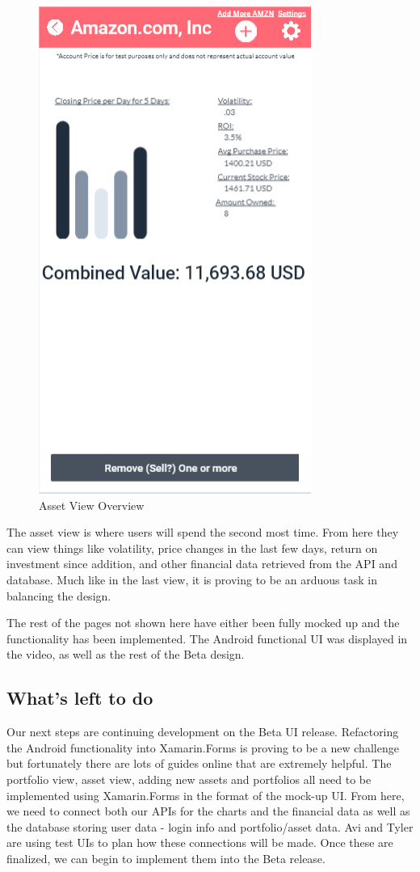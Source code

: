 \documentclass[letterpaper,10pt,titlepage,journal,compsoc,draftclsnofoot,onecolumn]{IEEEtran}
\begin{document}
\begin{figure}[h]
   \caption{Asset View Overview}
   \includegraphics[scale=.5]{asset_screenshot}
\end{figure}

The asset view is where users will spend the second most time. From here they can view things like volatility, price changes in the last few days, return on investment since addition, and other financial data retrieved from the API and database. Much like in the last view, it is proving to be an arduous task in balancing the design.

The rest of the pages not shown here have either been fully mocked up and the functionality has been implemented. The Android functional UI was displayed in the video, as well as the rest of the Beta design. 

\subsection{What's left to do}

Our next steps are continuing development on the Beta UI release. Refactoring the Android functionality into Xamarin.Forms is proving to be a new challenge but fortunately there are lots of guides online that are extremely helpful. The portfolio view, asset view, adding new assets and portfolios all need to be implemented using Xamarin.Forms in the format of the mock-up UI. From here, we need to connect both our APIs for the charts and the financial data as well as the database storing user data - login info and portfolio/asset data. Avi and Tyler are using test UIs to plan how these connections will be made. Once these are finalized, we can begin to implement them into the Beta release.
\end{document}
